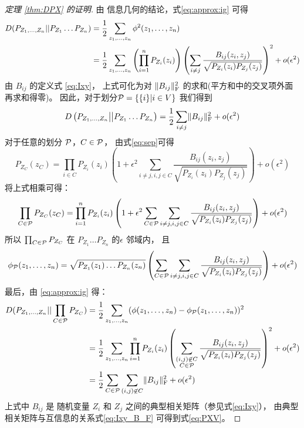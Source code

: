 \begin{proof}[定理 \ref{thm:DPX} 的证明]
由 信息几何的结论，式\eqref{eq:approx:ig} 可得
\begin{align*}
D(P_{Z_1,\dots, Z_n}|| P_{Z_1}\dots P_{Z_n}) & ={1 \over 2} \sum_{z_1,\dots,z_n}\phi^2(z_1,\dots, z_n) \\
& = {1\over 2}\sum_{z_1,\dots,z_n} \left(\prod_{i=1}^n  P_{Z_i} (z_i) \right) \left(\sum_{i\neq j}{B_{ij}(z_i, z_j) \over \sqrt{P_{Z_i}(z_i)P_{Z_j}(z_j)} }\right)^2 +o(\epsilon^2) 
\end{align*}
由 $B_{ij}$
的定义式 \eqref{eq:Ixy}，
上式可化为对 $\norm{B_{ij}}^2_{\mathrm{F}}$
的求和(平方和中的交叉项外面再求和得零)。
因此，对于划分$\P=\{\{i\}|i\in V\}$ 我们得到
\begin{equation}
D\left(P_{Z_1,\dots, Z_n}\big|\big| P_{Z_1}\dots P_{Z_n} \right) =
{1 \over 2} \sum_{i\neq j} \norm{B_{ij}}^2_{\mathrm{F}} + o(\epsilon^2)
\end{equation}
对于任意的划分 $\P$，$C\in \P$，
由式\eqref{eq:sep}可得
\begin{equation}
P_{Z_C}(z_C) = \prod_{i\in C} P_{Z_i}(z_i)
\left(1 + \epsilon^2 \sum_{i\neq j,i,j\in C} \frac{B_{ij}(z_i, z_j)}{\sqrt{P_{Z_i}(z_i)P_{Z_j}(z_j)}}
\right) + o(\epsilon^2)
\end{equation}
将上式相乘可得：
\begin{equation}
\prod_{C\in \P}P_{Z_C}(z_C) = \prod_{i=1}^n P_{Z_i}(z_i)
\left(1+\epsilon^2 \sum_{C\in\P}\sum_{i\neq j,i,j\in C}\frac{B_{ij}(z_i, z_j)}{\sqrt{P_{Z_i}(z_i)P_{Z_j}(z_j)}}
\right) + o(\epsilon^2)
\end{equation}
所以 $\prod_{C\in \P}P_{Z_C}$ 在 $P_{Z_1}\dots P_{Z_n}$ 的$\epsilon$ 邻域内，
且 $$\phi_{\P}(z_1,\dots, z_n)=
\sqrt{P_{Z_1}(z_1)\dots P_{Z_n}(z_n)}\left(\sum_{C\in\P}\sum_{i\neq j,i,j\in C}\frac{B_{ij}(z_i, z_j)}{\sqrt{P_{Z_i}(z_i)P_{Z_j}(z_j)}}\right)+o(\epsilon^2)$$
最后，由  \eqref{eq:approx:ig} 得：
\begin{align*}
D(P_{Z_1,\dots, Z_n}|| \prod_{C\in \P}P_{Z_C}) & ={1 \over 2} \sum_{z_1,\dots,z_n}(\phi(z_1,\dots, z_n)-\phi_{\P}(z_1, \dots, z_n))^2 \\
& = {1\over 2}\sum_{z_1,\dots,z_n} \prod_{i=1}^n  P_{Z_i} (z_i) \left(\sum_{\substack{(i,j) \not\in C\\ C\in \P}} {B_{ij}(z_i, z_j) \over \sqrt{P_{Z_i}(z_i)P_{Z_j}(z_j)} }\right)^2 +o(\epsilon^2) \\
& = \frac{1}{2} \sum_{C\in \P}\sum_{(i,j) \not\in C} \norm{B_{ij}}_{\mathrm{F}}^2 + o(\epsilon^2)
\end{align*}
上式中 $B_{ij}$ 是 随机变量  $Z_i$ 和 $Z_j$
之间的典型相关矩阵（参见式\eqref{eq:Ixy}），
由典型相关矩阵与互信息的关系式\eqref{eq:Ixy_B_F}
可得到式\eqref{eq:PXV}。
\end{proof}



